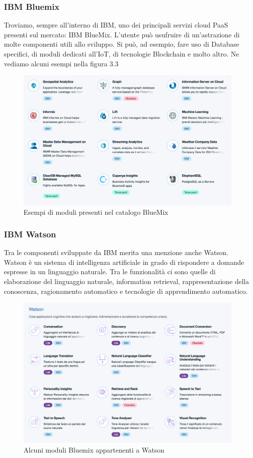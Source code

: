 \subsubsection{IBM Bluemix}
Troviamo, sempre all'interno di IBM, uno dei principali servizi cloud PaaS presenti sul mercato: IBM BlueMix. L'utente può usufruire di un'astrazione di molte componenti utili allo sviluppo. Si può, ad esempio, fare uso di Database specifici, di moduli dedicati all'IoT, di tecnologie Blockchain e molto altro. Ne vediamo alcuni esempi nella figura 3.3
\begin{figure}[h!]
	\centering
	\includegraphics[width=\textwidth,keepaspectratio=true]{capitoli/imgs/catalog.png}
	\caption{Esempi di moduli presenti nel catalogo BlueMix}
\end{figure}
\subsubsection{IBM Watson}
Tra le componenti sviluppate da IBM merita una menzione anche Watson. Watson è un sistema di intelligenza artificiale in grado di rispondere a domande espresse in un linguaggio naturale. Tra le funzionalità ci sono quelle di elaborazione del linguaggio naturale, information retrieval, rappresentazione della conoscenza, ragionamento automatico e tecnologie di apprendimento automatico.
\begin{figure}[h!]
	\centering
	\includegraphics[width=\textwidth,keepaspectratio=true]{capitoli/imgs/watson.png}
	\caption{Alcuni moduli Bluemix appartenenti a Watson}
\end{figure}

